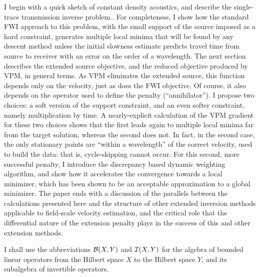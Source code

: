 I begin with a quick sketch of constant density acoustics, and
describe the single-trace transmission inverse problem.. For
completeness, I show how the standard FWI approach to this problem,
with the small support of the source imposed as a hard constraint,
generates multiple local minima that will be found by any descent
method unless the initial slowness estimate predicts travel time from
source to receiver with an error on the order of a wavelength. The
next section describes the extended source objective, and the reduced
objective produced by VPM, in general terms. As VPM eliminates the
extended source, this function depends only on the velocity, just as
does the FWI objective.  Of course, it also depends on the operator
used to define the penalty (``annihilator''). I propose two choices: a
soft version of the support constraint, and an even softer constraint,
namely multiplication by time. A nearly-explicit calculation of the
VPM gradient for these two choices shows that the first leads again to
multiple local minima far from the target solution, whereas the second
does not. In fact, in the second case, the only stationary points are
``within a wavelength'' of the correct velocity, used to build the
data: that is, cycle-skipping cannot occur. For this second, more
successful penalty, I introduce the discrepancy based dynamic
weighting algorithm, and show how it accelerates the convergence
towards a local minimizer, which has been shown to be an acceptable
approximation to a global minimizer. The paper ends with a discussion
of the parallels between the calculations presented here and the
structure of other extended inversion methods applicable to
field-scale velocity estimation, and the critical role that the
differential nature of the extension penalty plays in the success of
this and other extension methods.

I shall use the abbreviations ${\cal B}(X,Y)$ and ${\cal I}(X,Y)$ for
the algebra of bounded linear operators from the Hilbert space $X$ to
the Hilbert space $Y$, and its subalgebra of invertible operators.




